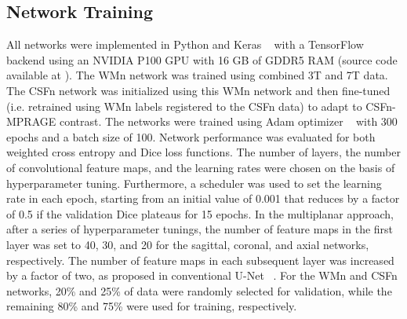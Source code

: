 \subsection{Network Training} All networks were implemented in Python and Keras \unskip~\cite{1643371:26789919} with a TensorFlow backend using an NVIDIA P100 GPU with 16 GB of GDDR5 RAM (source code available at ). The WMn network was trained using combined 3T and 7T data. The CSFn network was initialized using this WMn network and then fine-tuned (i.e. retrained using WMn labels registered to the CSFn data) to adapt to CSFn-MPRAGE contrast. The networks were trained using Adam optimizer \unskip~\cite{1643371:26789915} with 300 epochs and a batch size of 100. Network performance was evaluated for both weighted cross entropy and Dice loss functions. The number of layers, the number of convolutional feature maps, and the learning rates were chosen on the basis of hyperparameter tuning. Furthermore, a scheduler was used to set the learning rate in each epoch, starting from an initial value of 0.001 that reduces by a factor of 0.5 if the validation Dice plateaus for 15 epochs. In the multiplanar approach, after a series of hyperparameter tunings, the number of feature maps in the first layer was set to 40, 30, and 20 for the sagittal, coronal, and axial networks, respectively. The number of feature maps in each subsequent layer was increased by a factor of two, as proposed in conventional U-Net \unskip~\cite{1643371:26789965}. For the WMn and CSFn networks, 20\% and 25\% of data were randomly selected for validation, while the remaining 80\% and 75\% were used for training, respectively. 



